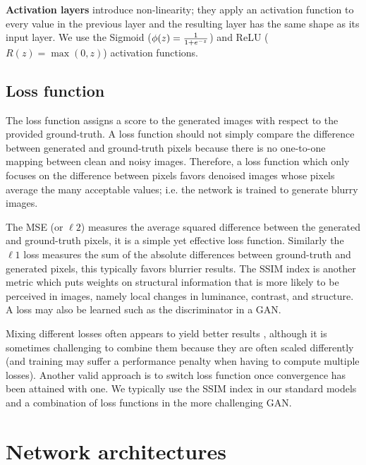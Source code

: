 \textbf{Activation layers} introduce non-linearity; they apply an activation function to every value in the previous layer and the resulting layer has the same shape as its input layer. We use the Sigmoid ($\phi(z)={1\over{1+e^{-z}}}$) and \ac{ReLU} ($R(z)=\max(0,z)$) activation functions. 


\subsection{Loss function}
The loss function assigns a score to the generated images with respect to the provided ground-truth. A loss function should not simply compare the difference between generated and ground-truth pixels because there is no one-to-one mapping between clean and noisy images. Therefore, a loss function which only focuses on the difference between pixels favors denoised images whose pixels average the many acceptable values; i.e. the network is trained to generate blurry images. \cite{pix2pix}

The \ac{MSE} (or $\ell 2$) measures the average squared difference between the generated and ground-truth pixels, it is a simple yet effective loss function. Similarly the $\ell 1$ loss measures the sum of the absolute differences between ground-truth and generated pixels, this typically favors blurrier results. The \ac{SSIM} index is another metric which puts weights on structural information that is more likely to be perceived in images, namely local changes in luminance, contrast, and structure. A loss may also be learned such as the discriminator in a \ac{GAN}.

Mixing different losses often appears to yield better results \cite{lossescomp}, although it is sometimes challenging to combine them because they are often scaled differently (and training may suffer a performance penalty when having to compute multiple losses). Another valid approach is to switch loss function once convergence has been attained with one. \cite{lossescomp} We typically use the \ac{SSIM} index in our standard models and a combination of loss functions in the more challenging \ac{GAN}.


\section{Network architectures}
